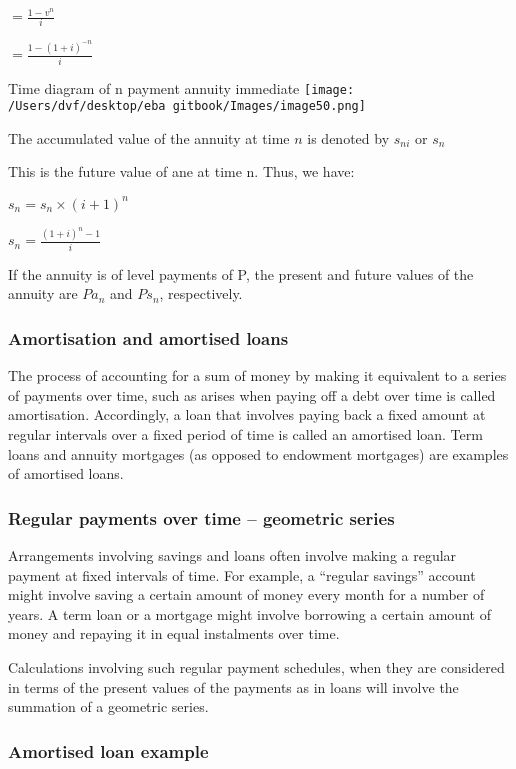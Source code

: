 \documentclass[]{book}
\theoremstyle{definition}
\theoremstyle{definition}
\theoremstyle{definition}
\theoremstyle{remark}
\begin{document}
\(= \frac{1-v^n}{i}\)

\(= \frac{1-(1+i)^{-n}}{i}\)

Time diagram of n payment annuity immediate
\texttt{[image: /Users/dvf/desktop/eba gitbook/Images/image50.png]}

The accumulated value of the annuity at time \(n\) is denoted by
\(s_{ni}\) or \(s_{n}\)

This is the future value of ane at time n. Thus, we have:

\(s_{n} = s_{n} \times (i+1)^n\)

\(s_{n} =\frac{(1+i)^{n}-1}{i}\)

If the annuity is of level payments of P, the present and future values
of the annuity are \(Pa_n\) and \(Ps_n\), respectively.

\subsubsection{Amortisation and amortised
loans}\label{amortisation-and-amortised-loans}

The process of accounting for a sum of money by making it equivalent to
a series of payments over time, such as arises when paying off a debt
over time is called amortisation. Accordingly, a loan that involves
paying back a fixed amount at regular intervals over a fixed period of
time is called an amortised loan. Term loans and annuity mortgages (as
opposed to endowment mortgages) are examples of amortised loans.

\subsubsection{Regular payments over time -- geometric
series}\label{regular-payments-over-time-geometric-series}

Arrangements involving savings and loans often involve making a regular
payment at fixed intervals of time. For example, a ``regular savings''
account might involve saving a certain amount of money every month for a
number of years. A term loan or a mortgage might involve borrowing a
certain amount of money and repaying it in equal instalments over time.

Calculations involving such regular payment schedules, when they are
considered in terms of the present values of the payments as in loans
will involve the summation of a geometric series.

\subsubsection{Amortised loan example}\label{amortised-loan-example}
\end{document}
